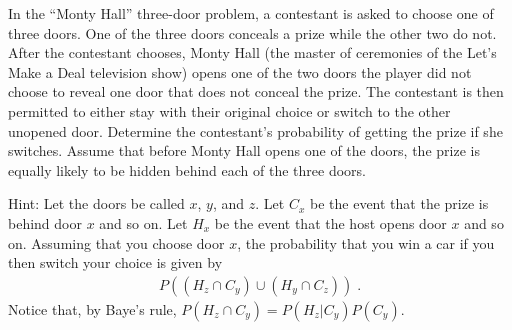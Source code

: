 \item
In the ``Monty Hall'' three-door problem, a contestant is asked to choose one of three doors. One of the three doors conceals a prize while the other two do not. After the contestant chooses, Monty Hall (the master of ceremonies of the Let's Make a Deal television show) opens one of the two doors the player did not choose to reveal one door that does not conceal the prize. The contestant is then permitted to either stay with their original choice or switch to the other unopened door. Determine the contestant's probability of getting the prize if she switches. Assume that before Monty Hall opens one of the doors, the prize is equally likely to be hidden behind each of the three doors.

Hint: Let the doors be called $x$, $y$, and $z$. Let $C_x$ be the event that the prize is behind door $x$ and so on. Let $H_x$ be the event that the host opens door $x$ and so on. Assuming that you choose door $x$, the probability that you win a car if you then switch your choice is given by
\begin{align*}
    P((H_z \cap C_y) \cup (H_y \cap C_z)) \; .
\end{align*}
Notice that, by Baye's rule, $P(H_z \cap C_y) = P(H_z|C_y) P(C_y)$.


